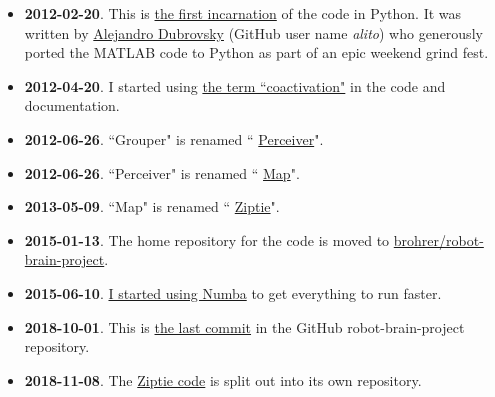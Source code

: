 \begin{itemize}
\item{\textbf{2012-02-20}.
This is
\href{https://github.com/alito/becca/commit/6eea91447608a1a6280ce915a26a18a85a57ef1c#diff-2106149c513c2a9fb07b17281f3830e992856b0c553b348f398b5d0fc3f96bc1}
{the first incarnation} of the code in Python. It was written
by
\href{https://www.linkedin.com/in/alejandro-dubrovsky-90b9b833/}{Alejandro Dubrovsky}
(GitHub user name \textit{alito}) who generously ported the MATLAB code
to Python as part of an epic weekend grind fest.
}

\item{\textbf{2012-04-20}.
I started using
\href{https://github.com/alito/becca/commit/dae6fa355c6bdcf9b5e2863d3b93dafa4fc4d5be#diff-2106149c513c2a9fb07b17281f3830e992856b0c553b348f398b5d0fc3f96bc1}
{the term ``coactivation"}
in the code and documentation.
}
\item{\textbf{2012-06-26}.
``Grouper" is renamed ``
\href{https://github.com/alito/becca/commit/6e7f968f283e287917cbbc9520297b833ad5d3aa#diff-e521b0d7fc82aa487ff7542d8a2672c0074ee1ae38705a48676fbad625e39bed}
{Perceiver}".
}

\item{\textbf{2012-06-26}.
``Perceiver" is renamed ``
\href{https://github.com/alito/becca/commit/dbb0374b164b6a5725b5bdf7d9eb208ddd82f855#diff-9338f7a12f369b96ae4414274afd08ce028c84758d252e683d937e6a56c48c9a}
{Map}".
}

\item{\textbf{2013-05-09}.
``Map" is renamed ``
\href{https://github.com/alito/becca/blob/ba07dde43f5a24fb35c1eabcc756a2cdc799287d/src/scripts/agent/ziptie.py}
{Ziptie}".
}

\item{\textbf{2015-01-13}.
The home repository for the code is moved to
\href{https://github.com/brohrer/robot-brain-project/blob/bc41b26373290acb6be0c9069be6ac6f3485b106/core/ziptie.py}
{brohrer/robot-brain-project}.
}

\item{\textbf{2015-06-10}.
\href{https://github.com/brohrer/robot-brain-project/commit/3815c5a10cf256e9f61eeec1a34f3b60f55d107f#diff-f47908520ba430339ff71c0fb1052bc986dafdd875ad83c9083ed4687f469945}
{I started using Numba} to get everything to run faster.
}

\item{\textbf{2018-10-01}.
This is
\href{https://github.com/brohrer/robot-brain-project/blob/53e2b52ab10e4ed7f92b3d488c49a6138d29a878/becca/ziptie.py}
{the last commit}
in the GitHub robot-brain-project repository.
}

\item{\textbf{2018-11-08}.
The
\href{https://github.com/brohrer/ziptie}
{Ziptie code} is split out into its own repository.
}

\end{itemize}


